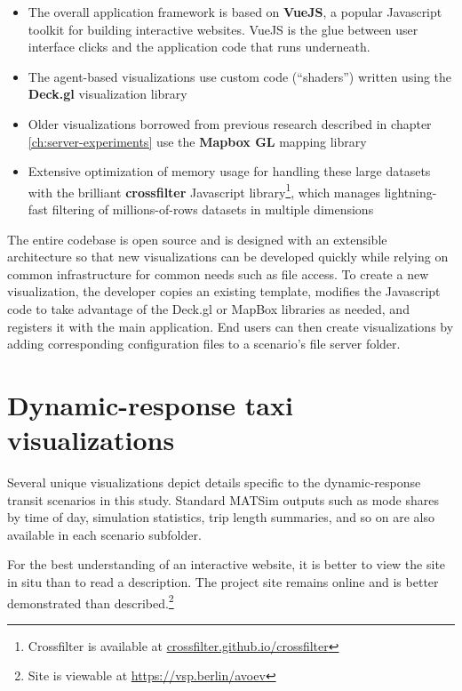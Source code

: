 \begin{itemize}
  \item The overall application framework is based on \textbf{VueJS}, a popular Javascript toolkit for building interactive websites. VueJS is the glue between user interface clicks and the application code that runs underneath.
  \item The agent-based visualizations use custom code (``shaders'') written using the \textbf{Deck.gl} visualization library
  \item Older visualizations borrowed from previous research described in chapter \ref{ch:server-experiments} use the \textbf{Mapbox GL} mapping library
  \item Extensive optimization of memory usage for handling these large datasets with the brilliant \textbf{crossfilter} Javascript library\footnote{Crossfilter is available at \href{https://crossfilter.github.io/crossfilter/}{crossfilter.github.io/crossfilter}}, which manages lightning-fast filtering of millions-of-rows datasets in multiple dimensions
\end{itemize}

The entire codebase is open source and is designed with an extensible architecture so that new visualizations can be developed quickly while relying on common infrastructure for common needs such as file access. To create a new visualization, the developer copies an existing template, modifies the Javascript code to take advantage of the Deck.gl or MapBox libraries as needed, and registers it with the main application. End users can then create visualizations by adding corresponding configuration files to a scenario's file server folder.

\section{Dynamic-response taxi visualizations}
\label{avov-drtviz}

Several unique visualizations depict details specific to the dynamic-response transit scenarios in this study. Standard MATSim outputs such as mode shares by time of day, simulation statistics, trip length summaries, and so on are also available in each scenario subfolder.

For the best understanding of an interactive website, it is better to view the site in situ than to read a description. The project site remains online and is better demonstrated than described.\footnote{Site is viewable at \href{https://vsp.berlin/avoev/}{https://vsp.berlin/avoev}}


